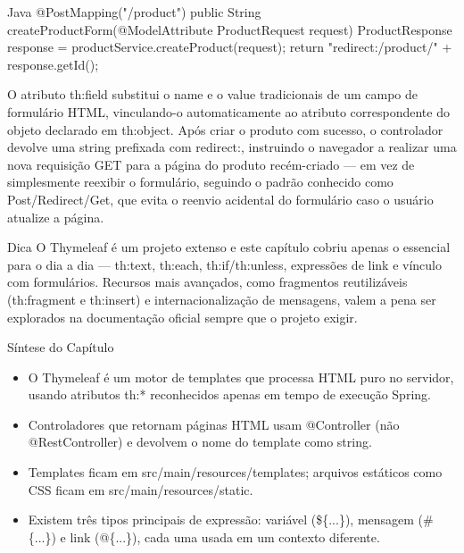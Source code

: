 \begin{codebox}{Java}
@PostMapping("/product")
public String createProductForm(@ModelAttribute ProductRequest request) {
    ProductResponse response = productService.createProduct(request);
    return "redirect:/product/" + response.getId();
}
\end{codebox}

O atributo th:field substitui o name e o value tradicionais de um campo de formulário HTML, vinculando-o automaticamente ao atributo correspondente do objeto declarado em th:object. Após criar o produto com sucesso, o controlador devolve uma string prefixada com redirect:, instruindo o navegador a realizar uma nova requisição GET para a página do produto recém-criado — em vez de simplesmente reexibir o formulário, seguindo o padrão conhecido como Post/Redirect/Get, que evita o reenvio acidental do formulário caso o usuário atualize a página.

\begin{infobox}{Dica}
O Thymeleaf é um projeto extenso e este capítulo cobriu apenas o essencial para o dia a dia — th:text, th:each, th:if/th:unless, expressões de link e vínculo com formulários. Recursos mais avançados, como fragmentos reutilizáveis (th:fragment e th:insert) e internacionalização de mensagens, valem a pena ser explorados na documentação oficial sempre que o projeto exigir.
\end{infobox}

Síntese do Capítulo

\begin{itemize}
  \item O Thymeleaf é um motor de templates que processa HTML puro no servidor, usando atributos th:* reconhecidos apenas em tempo de execução Spring.
\end{itemize}

\begin{itemize}
  \item Controladores que retornam páginas HTML usam @Controller (não @RestController) e devolvem o nome do template como string.
\end{itemize}

\begin{itemize}
  \item Templates ficam em src/main/resources/templates; arquivos estáticos como CSS ficam em src/main/resources/static.
\end{itemize}

\begin{itemize}
  \item Existem três tipos principais de expressão: variável (\$\{...\}), mensagem (\#\{...\}) e link (@\{...\}), cada uma usada em um contexto diferente.
\end{itemize}

